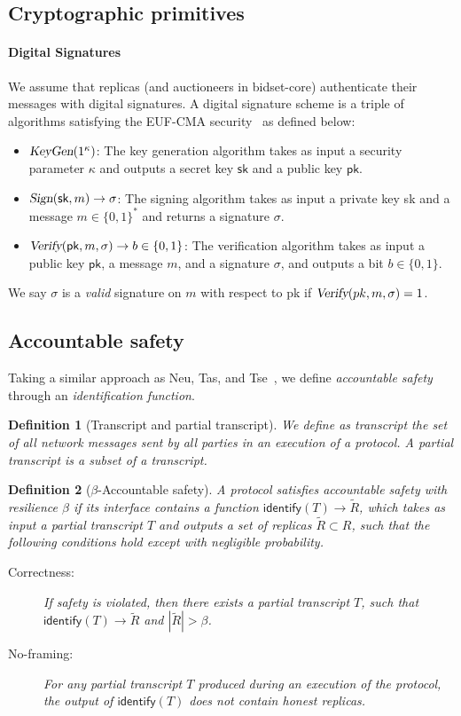 \documentclass[pdflatex,sn-mathphys-num]{sn-jnl}%
\theoremstyle{thmstyleone}%
\theoremstyle{thmstyletwo}%
\theoremstyle{thmstylethree}%
\newtheorem{definition}{Definition}%
\newcommand{\bidsettm}{\textsf{bidset}\xspace}
\newcommand{\op}[1]{\textsl{#1}}
\newcommand{\opSign}[1]{\op{Sign}(#1)\xspace}
\newcommand{\opVerify}[1]{\op{Verify}(#1)\xspace}
\newcommand{\operand}[1]{\textsf{#1}}
\newcommand{\sk}{\operand{sk}\xspace}
\newcommand{\pk}{\operand{pk}\xspace}
\newcommand{\replicas}{\ensuremath{R}\xspace}
\newcommand{\cheaters}{\ensuremath{\tilde{\replicas}}\xspace}
\newcommand{\identify}[1]{\ensuremath{\mathsf{identify}(#1)}\xspace}
\newcommand{\tran}{\ensuremath{T}\xspace}
\newcommand{\dotparagraph}[1]{\paragraph*{#1}}
\newcommand{\zo}{\ensuremath{\{ 0, 1\}\xspace}}
\let\oldbeta\beta
\renewcommand{\beta}{\ensuremath{\oldbeta}\xspace}
\newcommand{\sig}{\ensuremath{\sigma}\xspace}
\begin{document}
\subsection{Cryptographic primitives}
\dotparagraph{\textbf{Digital Signatures}} We assume that replicas (and auctioneers in \bidsettm-core) authenticate their messages with digital signatures. A digital signature scheme is a triple of algorithms satisfying the EUF-CMA security~\cite{GMR88} as defined below:
		\begin{itemize}
	    	\item $\textsl{KeyGen}(1^{\kappa})$: The key generation algorithm takes as input a security parameter $\kappa$ and outputs a secret key $\sk$ and a public key $\pk$.
	        \item
	            $\opSign{\sk, m} \rightarrow \sig$:
	            The signing algorithm takes as input a private key
	            \sk and a message $m \in \zo^*$ and returns a signature $\sig$.
	        \item
	            $\opVerify{\pk, m, \sig} \rightarrow b \in \zo$:
	            The verification algorithm takes as input a public
	            key $\pk$, a message $m$, and a signature $\sig$, and outputs a bit $b\in \zo$.
	    \end{itemize}
We say \sig is a \emph{valid} signature on $m$ with respect to \pk if $\opVerify{pk, m, \sig} = 1$.

\subsection{Accountable safety}\label{sec:accountable-safety}
Taking a similar approach as Neu, Tas, and Tse~\cite[Def. 4]{FC:NeuTasTse22}, we define \emph{accountable safety} through an \emph{identification function}.

\begin{definition}[Transcript and partial transcript]
    We define as \emph{transcript} the set of all network messages sent by all parties in an execution of a protocol.
    A \emph{partial transcript} is a subset of a transcript.
\end{definition}

\begin{definition}[\beta-Accountable safety]\label{def:accountable-safety}
    A protocol satisfies \emph{accountable safety} with \emph{resilience} \beta if its interface contains a function $\identify{\tran} \rightarrow \cheaters$,
    which takes as input a partial transcript $\tran$ and outputs a set of replicas $\cheaters \subset \replicas$, such that the
    following conditions hold except with negligible probability.
    \begin{description}
        \item[Correctness:] If safety is violated, then there exists a partial transcript \tran, such that $\identify{\tran} \rightarrow \cheaters$ and $|\cheaters| > \beta$.
        \item[No-framing:] For any partial transcript \tran produced during an execution of the protocol, the output of $\identify{\tran}$ does not contain honest replicas.
    \end{description}
\end{definition}
\end{document}
